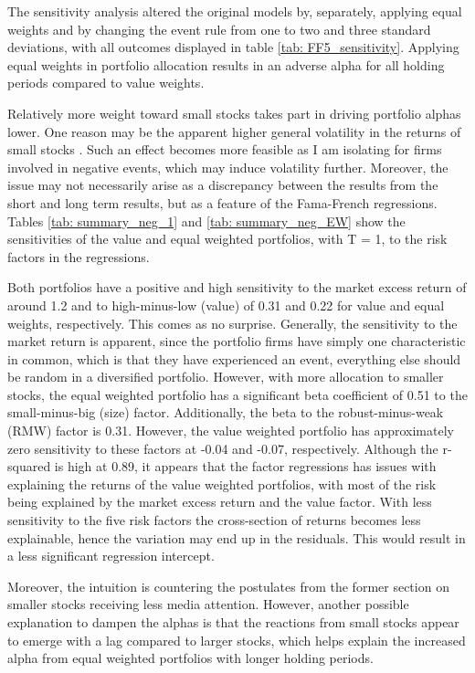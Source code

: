 The sensitivity analysis altered the original models by, separately, applying equal weights and by changing the event rule from one to two and three standard deviations, with all outcomes displayed in table \ref{tab: FF5_sensitivity}. Applying equal weights in portfolio allocation results in an adverse alpha for all holding periods compared to value weights. 

Relatively more weight toward small stocks takes part in driving portfolio alphas lower. One reason may be the apparent higher general volatility in the returns of small stocks \citep{Fama_french_3fac}. Such an effect becomes more feasible as I am isolating for firms involved in negative events, which may induce volatility further. Moreover, the issue may not necessarily arise as a discrepancy between the results from the short and long term results, but as a feature of the Fama-French regressions. Tables \ref{tab: summary_neg_1} and \ref{tab: summary_neg_EW} show the sensitivities of the value and equal weighted portfolios, with T = 1, to the risk factors in the regressions. 

Both portfolios have a positive and high sensitivity to the market excess return of around 1.2 and to high-minus-low (value) of 0.31 and 0.22 for value and equal weights, respectively. This comes as no surprise. Generally, the sensitivity to the market return is apparent, since the portfolio firms have simply one characteristic in common, which is that they have experienced an event, everything else should be random in a diversified portfolio. However, with more allocation to smaller stocks, the equal weighted portfolio has a significant beta coefficient of 0.51 to the small-minus-big (size) factor. Additionally, the beta to the robust-minus-weak (RMW) factor is 0.31. However, the value weighted portfolio has approximately zero sensitivity to these factors at -0.04 and -0.07, respectively. Although the r-squared is high at 0.89, it appears that the factor regressions has issues with explaining the returns of the value weighted portfolios, with most of the risk being explained by the market excess return and the value factor. With less sensitivity to the five risk factors the cross-section of returns becomes less explainable, hence the variation may end up in the residuals. This would result in a less significant regression intercept.  

Moreover, the intuition is countering the postulates from the former section on smaller stocks receiving less media attention. However, another possible explanation to dampen the alphas is that the reactions from small stocks appear to emerge with a lag compared to larger stocks, which helps explain the increased alpha from equal weighted portfolios with longer holding periods. 


